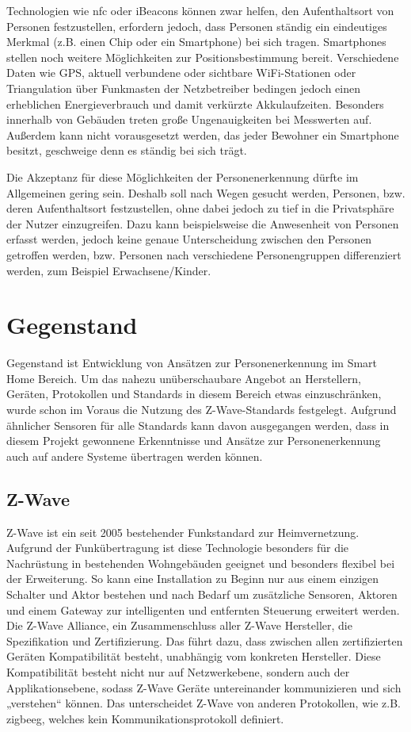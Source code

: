 \documentclass[12pt, oneside, smallheadings]{scrbook}
\begin{document}
Technologien wie \gls{nfc} oder iBeacons können zwar helfen, den Aufenthaltsort von Personen festzustellen, erfordern jedoch, dass Personen ständig ein eindeutiges Merkmal (z.B. einen Chip oder ein Smartphone) bei sich tragen. Smartphones stellen noch weitere Möglichkeiten zur Positionsbestimmung bereit. Verschiedene Daten wie GPS, aktuell verbundene oder sichtbare WiFi-Stationen oder Triangulation über Funkmasten der Netzbetreiber bedingen jedoch einen erheblichen Energieverbrauch und damit verkürzte Akkulaufzeiten. Besonders innerhalb von Gebäuden treten große Ungenauigkeiten bei Messwerten auf. Außerdem kann nicht vorausgesetzt werden, das jeder Bewohner ein Smartphone besitzt, geschweige denn es ständig bei sich trägt.

Die Akzeptanz für diese Möglichkeiten der Personenerkennung dürfte im Allgemeinen gering sein. Deshalb soll nach Wegen gesucht werden, Personen, bzw. deren Aufenthaltsort festzustellen, ohne dabei jedoch zu tief in die Privatsphäre der Nutzer einzugreifen. Dazu kann beispielsweise die Anwesenheit von Personen erfasst werden, jedoch keine genaue Unterscheidung zwischen den Personen getroffen werden, bzw. Personen nach verschiedene Personengruppen differenziert werden, zum Beispiel Erwachsene/Kinder.

\section{Gegenstand}

Gegenstand ist Entwicklung von Ansätzen zur Personenerkennung im Smart Home Bereich. Um das nahezu unüberschaubare Angebot an Herstellern, Geräten, Protokollen und Standards in diesem Bereich etwas einzuschränken, wurde schon im Voraus die Nutzung des Z-Wave-Standards festgelegt. Aufgrund ähnlicher Sensoren für alle Standards kann davon ausgegangen werden, dass in diesem Projekt gewonnene Erkenntnisse und Ansätze zur Personenerkennung auch auf andere Systeme übertragen werden können.

\subsection{Z-Wave}

Z-Wave ist ein seit 2005 bestehender Funkstandard zur Heimvernetzung. Aufgrund der Funkübertragung ist diese Technologie besonders für die Nachrüstung in bestehenden Wohngebäuden geeignet und besonders flexibel bei der Erweiterung. So kann eine Installation zu Beginn nur aus einem einzigen Schalter und Aktor bestehen und nach Bedarf um zusätzliche Sensoren, Aktoren und einem Gateway zur intelligenten und entfernten Steuerung erweitert werden.
Die Z-Wave Alliance, ein Zusammenschluss aller Z-Wave Hersteller, die Spezifikation und Zertifizierung. Das führt dazu, dass zwischen allen zertifizierten Geräten Kompatibilität besteht, unabhängig vom konkreten Hersteller. Diese Kompatibilität besteht nicht nur auf Netzwerkebene, sondern auch der Applikationsebene, sodass Z-Wave Geräte untereinander kommunizieren und sich „verstehen“ können. Das unterscheidet Z-Wave von anderen Protokollen, wie z.B. \gls{zigbeeg}, welches kein Kommunikationsprotokoll definiert.
\end{document}
